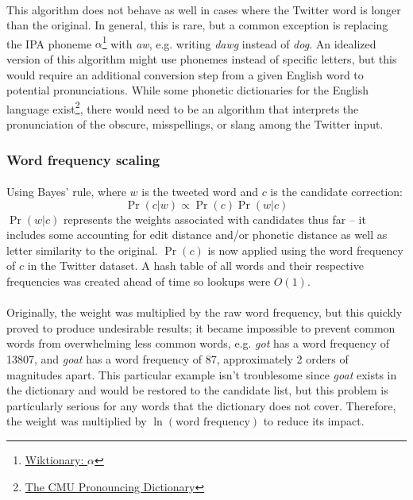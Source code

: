\documentclass[twocolumn,10pt]{article}
\begin{document}
\paragraph{} This algorithm does not behave as well in cases where the Twitter word is longer than the original. In general, this is rare, but a common exception is replacing the IPA phoneme $\alpha$\footnote{\href{http://en.wiktionary.org/wiki/\%C9\%91}{Wiktionary: $\alpha$}} with \textit{aw}, e.g. writing \textit{dawg} instead of \textit{dog}. An idealized version of this algorithm might use phonemes instead of specific letters, but this would require an additional conversion step from a given English word to potential pronunciations. While some phonetic dictionaries for the English language exist\footnote{\href{http://www.speech.cs.cmu.edu/cgi-bin/cmudict}{The CMU Pronouncing Dictionary}}, there would need to be an algorithm that interprets the pronunciation of the obscure, misspellings, or slang among the Twitter input.
\subsubsection*{Word frequency scaling}
\paragraph{}Using Bayes' rule, where $w$ is the tweeted word and $c$ is the candidate correction:
$$\Pr(c|w) \varpropto \Pr(c) \Pr(w|c)$$
$\Pr(w|c)$ represents the weights associated with candidates thus far -- it includes some accounting for edit distance and/or phonetic distance as well as letter similarity to the original. $\Pr(c)$ is now applied using the word frequency of $c$ in the Twitter dataset. A hash table of all words and their respective frequencies was created ahead of time so lookups were $O(1)$. \paragraph{} Originally, the weight was multiplied by the raw word frequency, but this quickly proved to produce undesirable results; it became impossible to prevent common words from overwhelming less common words, e.g. \textit{got} has a word frequency of 13807, and \textit{goat} has a word frequency of 87, approximately 2 orders of magnitudes apart. This particular example isn't troublesome since \textit{goat} exists in the dictionary and would be restored to the candidate list, but this problem is particularly serious for any words that the dictionary does not cover. Therefore, the weight was multiplied by $\ln (\text{word frequency})$ to reduce its impact.
\end{document}

